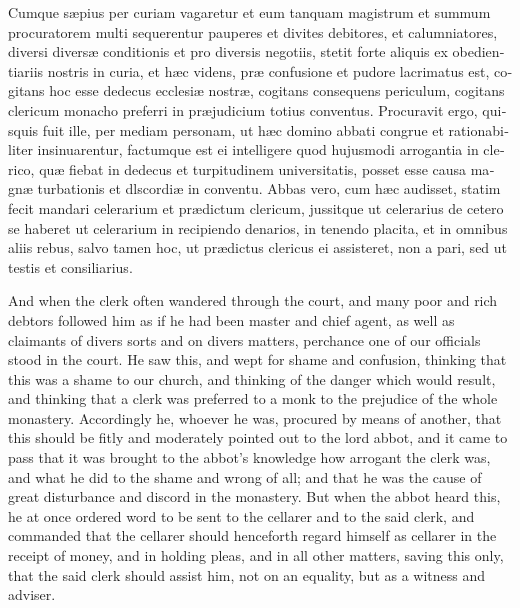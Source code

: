 \documentclass[10pt]{book}
\begin{document}
\begin{paracol}{2}
\switchcolumn*

\begin{otherlanguage}{latin}
Cumque s\ae{}pius per curiam vagaretur et eum tanquam magistrum et summum procuratorem multi sequerentur pauperes et divites debitores, et calumniatores, diversi divers\ae{} conditionis et pro diversis negotiis, stetit forte aliquis ex obedientiariis nostris in curia, et h\ae{}c videns, pr\ae{} confusione et pudore lacrimatus est, cogitans hoc esse dedecus ecclesi\ae{} nostr\ae{}, cogitans consequens periculum, cogitans clericum monacho preferri in pr\ae{}judicium totius conventus. Procuravit ergo, quisquis fuit ille, per mediam personam, ut h\ae{}c domino abbati congrue et rationabiliter insinuarentur, factumque est ei intelligere quod hujusmodi arrogantia in clerico, qu\ae{} fiebat in dedecus et turpitudinem universitatis, posset esse causa magn\ae{} turbationis et dlscordi\ae{} in conventu. Abbas vero, cum h\ae{}c audisset, statim fecit mandari celerarium et pr\ae{}dictum clericum, jussitque ut celerarius de cetero se haberet ut celerarium in recipiendo denarios, in tenendo placita, et in omnibus aliis rebus, salvo tamen hoc, ut pr\ae{}dictus clericus ei assisteret, non a pari, sed ut testis et consiliarius.
\end{otherlanguage}

\switchcolumn

And when the clerk often wandered through the court, and many poor and rich debtors followed him as if he had been master and chief agent, as well as claimants of divers sorts and on divers matters, perchance one of our officials stood in the court. He saw this, and wept for shame and confusion, thinking that this was a shame to our church, and thinking of the danger which would result, and thinking that a clerk was preferred to a monk to the prejudice of the whole monastery. Accordingly he, whoever he was, procured by means of another, that this should be fitly and moderately pointed out to the lord abbot, and it came to pass that it was brought to the abbot's knowledge how arrogant the clerk was, and what he did to the shame and wrong of all; and that he was the cause of great disturbance and discord in the monastery. But when the abbot heard this, he at once ordered word to be sent to the cellarer and to the said clerk, and commanded that the cellarer should henceforth regard himself as cellarer in the receipt of money, and in holding pleas, and in all other matters, saving this only, that the said clerk should assist him, not on an equality, but as a witness and adviser.


\end{paracol}
\end{document}
